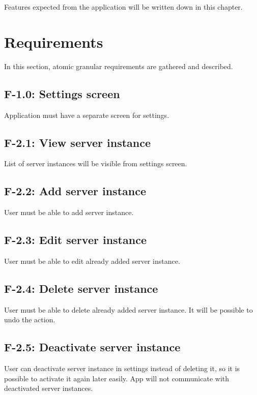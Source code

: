 Features expected from the application will be written down in this chapter.
\section{Requirements}
In this section, atomic granular  requirements are gathered and described.

\subsection*{F-1.0: Settings screen}
Application must have a separate screen for settings. 
\subsection*{F-2.1: View server instance}
List of server instances will be visible from settings screen.
\subsection*{F-2.2: Add server instance}
User must be able to add server instance.
\subsection*{F-2.3: Edit server instance}
User must be able to edit already added server instance.
\subsection*{F-2.4: Delete server instance}
User must be able to delete already added server instance. It will be possible to undo the action.
\subsection*{F-2.5: Deactivate server instance}
User can deactivate server instance in settings instead of deleting it, so it is possible to activate it again later easily. App will not communicate with deactivated server instances.
